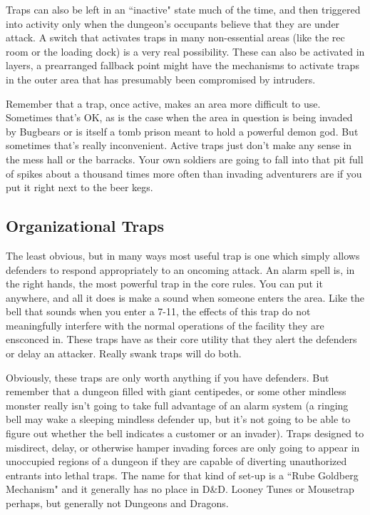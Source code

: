 Traps can also be left in an ``inactive" state much of the time, and then triggered into activity only when the dungeon's occupants believe that they are under attack. A switch that activates traps in many non-essential areas (like the rec room or the loading dock) is a very real possibility. These can also be activated in layers, a prearranged fallback point might have the mechanisms to activate traps in the outer area that has presumably been compromised by intruders.

Remember that a trap, once active, makes an area more difficult to use. Sometimes that's OK, as is the case when the area in question is being invaded by Bugbears or is itself a tomb prison meant to hold a powerful demon god. But sometimes that's really inconvenient. Active traps just don't make any sense in the mess hall or the barracks. Your own soldiers are going to fall into that pit full of spikes about a thousand times more often than invading adventurers are if you put it right next to the beer kegs.

\subsection{Organizational Traps}

The least obvious, but in many ways most useful trap is one which simply allows defenders to respond appropriately to an oncoming attack. An alarm spell is, in the right hands, the most powerful trap in the core rules. You can put it anywhere, and all it does is make a sound when someone enters the area. Like the bell that sounds when you enter a 7-11, the effects of this trap do not meaningfully interfere with the normal operations of the facility they are ensconced in. These traps have as their core utility that they alert the defenders or delay an attacker. Really swank traps will do both.

Obviously, these traps are only worth anything if you have defenders. But remember that a dungeon filled with giant centipedes, or some other mindless monster really isn't going to take full advantage of an alarm system (a ringing bell may wake a sleeping mindless defender up, but it's not going to be able to figure out whether the bell indicates a customer or an invader). Traps designed to misdirect, delay, or otherwise hamper invading forces are only going to appear in unoccupied regions of a dungeon if they are capable of diverting unauthorized entrants into lethal traps. The name for that kind of set-up is a ``Rube Goldberg Mechanism" and it generally has no place in D\&D. Looney Tunes or Mousetrap perhaps, but generally not Dungeons and Dragons.

